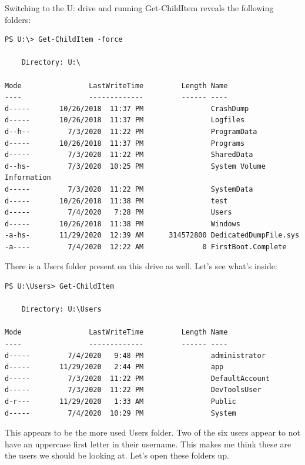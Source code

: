 \documentclass[../main.tex]{subfiles}
\begin{document}
Switching to the U: drive and running Get-ChildItem reveals the following folders:

\begin{lstlisting}
PS U:\> Get-ChildItem -force

    Directory: U:\

Mode                LastWriteTime         Length Name
----                -------------         ------ ----
d-----       10/26/2018  11:37 PM                CrashDump
d-----       10/26/2018  11:37 PM                Logfiles
d--h--         7/3/2020  11:22 PM                ProgramData
d-----       10/26/2018  11:37 PM                Programs
d-----         7/3/2020  11:22 PM                SharedData
d--hs-         7/3/2020  10:25 PM                System Volume Information
d-----         7/3/2020  11:22 PM                SystemData
d-----       10/26/2018  11:38 PM                test
d-----         7/4/2020   7:28 PM                Users
d-----       10/26/2018  11:38 PM                Windows
-a-hs-       11/29/2020  12:39 AM      314572800 DedicatedDumpFile.sys
-a----         7/4/2020  12:22 AM              0 FirstBoot.Complete
\end{lstlisting}

There is a Users folder present on this drive as well. Let's see what's inside:

\begin{lstlisting}
PS U:\Users> Get-ChildItem

    Directory: U:\Users

Mode                LastWriteTime         Length Name                          
----                -------------         ------ ----                          
d-----         7/4/2020   9:48 PM                administrator                 
d-----       11/29/2020   2:44 PM                app                           
d-----         7/3/2020  11:22 PM                DefaultAccount                
d-----         7/3/2020  11:22 PM                DevToolsUser                  
d-r---       11/29/2020   1:33 AM                Public                        
d-----         7/4/2020  10:29 PM                System
\end{lstlisting}

This appears to be the more used Users folder. Two of the six users appear to not have an uppercase first letter in their username. This makes me think these are the users we should be looking at. Let's open these folders up.
\end{document}
